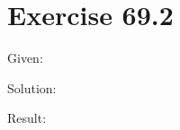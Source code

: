 \documentclass[a4paper, 10pt]{scrartcl}
\begin{document}
\section{Exercise 69.2}

Given:

Solution:

Result:
\end{document}
